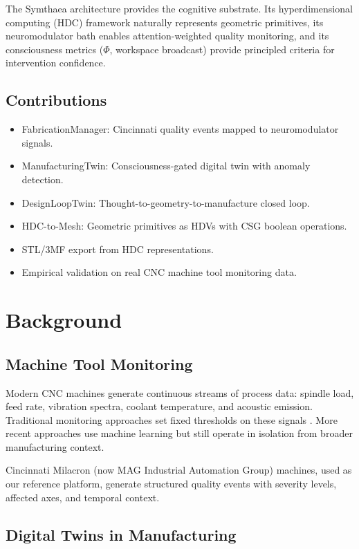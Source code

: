 \documentclass[11pt,a4paper]{article}
\begin{document}
The Symthaea architecture \citep{stoltz2026symthaea} provides the cognitive substrate. Its hyperdimensional computing (HDC) framework naturally represents geometric primitives, its neuromodulator bath enables attention-weighted quality monitoring, and its consciousness metrics ($\Phi$, workspace broadcast) provide principled criteria for intervention confidence.

\subsection{Contributions}

\begin{itemize}[nosep]
    \item FabricationManager: Cincinnati quality events mapped to neuromodulator signals.
    \item ManufacturingTwin: Consciousness-gated digital twin with anomaly detection.
    \item DesignLoopTwin: Thought-to-geometry-to-manufacture closed loop.
    \item HDC-to-Mesh: Geometric primitives as HDVs with CSG boolean operations.
    \item STL/3MF export from HDC representations.
    \item Empirical validation on real CNC machine tool monitoring data.
\end{itemize}

\section{Background}

\subsection{Machine Tool Monitoring}

Modern CNC machines generate continuous streams of process data: spindle load, feed rate, vibration spectra, coolant temperature, and acoustic emission. Traditional monitoring approaches set fixed thresholds on these signals \citep{tlusty1983}. More recent approaches use machine learning \citep{wu2017} but still operate in isolation from broader manufacturing context.

Cincinnati Milacron (now MAG Industrial Automation Group) machines, used as our reference platform, generate structured quality events with severity levels, affected axes, and temporal context.

\subsection{Digital Twins in Manufacturing}
\end{document}
